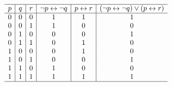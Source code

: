 {{\begin{practices}
\begin{enumerate}[A.]
{\begin{table}[H]
\[\begin{array}{c|c|c|c|c|c}
                                \hline
                                p & q & r & \neg p \leftrightarrow \neg q & p \leftrightarrow r & (\neg p \leftrightarrow \neg q) \vee (p \leftrightarrow r) \\
                                \hline
                                0 & 0 & 0 & 1 & 1 & 1 \\
                                0 & 0 & 1 & 1 & 0 & 0 \\
                                0 & 1 & 0 & 0 & 0 & 1 \\
                                0 & 1 & 1 & 0 & 1 & 0 \\
                                1 & 0 & 0 & 0 & 1 & 0 \\
                                1 & 0 & 1 & 0 & 0 & 1 \\
                                1 & 1 & 0 & 1 & 0 & 0 \\
                                1 & 1 & 1 & 1 & 1 & 1 \\
                                \hline
                            \end{array}
                        \]
                    \end{table}
                }
            \end{enumerate}
        \end{practices}

}}
